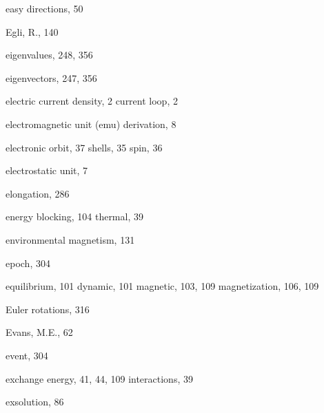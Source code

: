 \documentclass[,plain]{tauxe}
\begin{document}
\begin{theindex}
  \indexspace

  \item easy directions, 50
  \item Egli, R., 140
  \item eigenvalues, 248, 356
  \item eigenvectors, 247, 356
  \item electric
    \subitem current density, 2
    \subitem current loop, 2
  \item electromagnetic unit (emu)
    \subitem derivation, 8
  \item electronic
    \subitem orbit, 37
    \subitem shells, 35
    \subitem spin, 36
  \item electrostatic unit, 7
  \item elongation, 286
  \item energy
    \subitem blocking, 104
    \subitem thermal, 39
  \item environmental magnetism, 131
  \item epoch, 304
  \item equilibrium, 101
    \subitem dynamic, 101
    \subitem magnetic, 103, 109
    \subitem magnetization, 106, 109
  \item Euler rotations, 316
  \item Evans, M.E., 62
  \item event, 304
  \item exchange
    \subitem energy, 41, 44, 109
    \subitem interactions, 39
  \item exsolution, 86

  \indexspace


\end{theindex}
\end{document}
